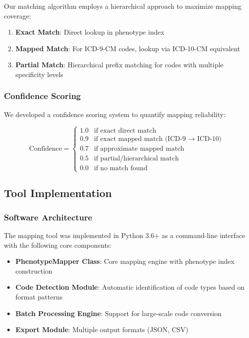 \documentclass[11pt]{article}
\begin{document}
Our matching algorithm employs a hierarchical approach to maximize mapping coverage:

\begin{enumerate}
    \item \textbf{Exact Match}: Direct lookup in phenotype index
    \item \textbf{Mapped Match}: For ICD-9-CM codes, lookup via ICD-10-CM equivalent
    \item \textbf{Partial Match}: Hierarchical prefix matching for codes with multiple specificity levels
\end{enumerate}

\subsubsection{Confidence Scoring}

We developed a confidence scoring system to quantify mapping reliability:

\begin{equation}
\text{Confidence} = \begin{cases}
1.0 & \text{if exact direct match} \\
0.9 & \text{if exact mapped match (ICD-9 $\rightarrow$ ICD-10)} \\
0.7 & \text{if approximate mapped match} \\
0.5 & \text{if partial/hierarchical match} \\
0.0 & \text{if no match found}
\end{cases}
\end{equation}

\subsection{Tool Implementation}

\subsubsection{Software Architecture}

The mapping tool was implemented in Python 3.6+ as a command-line interface with the following core components:

\begin{itemize}
    \item \textbf{PhenotypeMapper Class}: Core mapping engine with phenotype index construction
    \item \textbf{Code Detection Module}: Automatic identification of code types based on format patterns
    \item \textbf{Batch Processing Engine}: Support for large-scale code conversion
    \item \textbf{Export Module}: Multiple output formats (JSON, CSV)
\end{itemize}
\end{document}
